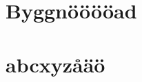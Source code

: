 \documentclass{article}
\title{\VAR{Title}}
\date{August 2021}
\begin{document}
\maketitle

\section{Byggnööööad}
\section{abcxyzåäö}
\end{document}
